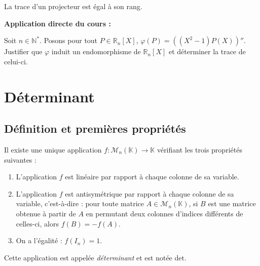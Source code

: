 \documentclass[french,11pt,twoside]{VcCours}
\newenvironment{ApplicationDirecte}{\textbf{Application directe du cours :}

}{}
\begin{document}
\medskip

\begin{Exemple} La trace d'un projecteur est égal à son rang.


\newpage
\vspace*{5cm}
\medskip

\end{Exemple}

\begin{ApplicationDirecte} Soit $n \in \mathbb{N}^*$. Posons pour tout $P \in \mathbb{R}_n[X]$, $\varphi(P) = ((X^2-1)P(X))''$. Justifier que $\varphi$ induit un endomorphisme de $\mathbb{R}_n[X]$ et déterminer la trace de celui-ci.
\end{ApplicationDirecte}

\section{Déterminant}

\subsection{Définition et premières propriétés}

\begin{Definition}{} Il existe une unique application $f : \mathcal{M}_n(\mathbb{K}) \rightarrow \mathbb{K}$ vérifiant les trois propriétés suivantes :

\begin{enumerate}
\item L'application $f$ est linéaire par rapport à chaque colonne de sa variable.
\item L'application $f$ est antisymétrique par rapport à chaque colonne de sa variable, c'est-à-dire : pour toute matrice $A \in \mathcal{M}_n(\mathbb{K})$, si $B$ est une matrice obtenue à partir de $A$ en permutant deux colonnes d'indices différents de celles-ci, alors $f(B)=-f(A)$.
\item On a l'égalité : $f(I_n)=1$.
\end{enumerate}

Cette application est appelée \emph{déterminant} et est notée $\textrm{det}$.
\end{Definition}
\end{document}
